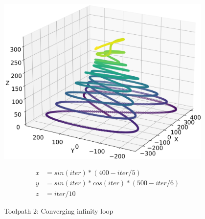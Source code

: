 \begin{figure}[H]%
	\centering
	\begin{minipage}{0.5\textwidth}
			\includegraphics[width=0.95\textwidth]{figures/path2.png}
		\caption{Toolpath 2: Converging infinity loop}
		\label{path2}
	\end{minipage}\hfill
	\begin{minipage}{0.5\textwidth}
		\begin{equation}\label{eq2}
			\begin{split}
				x &= sin(iter) * (400-iter / 5)\\
				y &= sin(iter) * cos(iter) * (500-iter / 6)\\
				z &= iter / 10
			\end{split}
		\end{equation}
	\end{minipage}\par
\end{figure}


